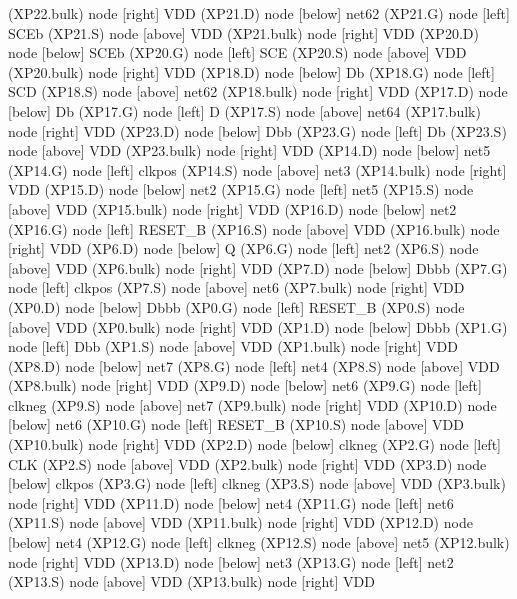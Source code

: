 \begin{circuitikz}[american]
	(XP22.bulk) node [right]	{VDD}
	(XP21.D) node [below]	{net62}
	(XP21.G) node [left]	{SCEb}
	(XP21.S) node [above]	{VDD}
	(XP21.bulk) node [right]	{VDD}
	(XP20.D) node [below]	{SCEb}
	(XP20.G) node [left]	{SCE}
	(XP20.S) node [above]	{VDD}
	(XP20.bulk) node [right]	{VDD}
	(XP18.D) node [below]	{Db}
	(XP18.G) node [left]	{SCD}
	(XP18.S) node [above]	{net62}
	(XP18.bulk) node [right]	{VDD}
	(XP17.D) node [below]	{Db}
	(XP17.G) node [left]	{D}
	(XP17.S) node [above]	{net64}
	(XP17.bulk) node [right]	{VDD}
	(XP23.D) node [below]	{Dbb}
	(XP23.G) node [left]	{Db}
	(XP23.S) node [above]	{VDD}
	(XP23.bulk) node [right]	{VDD}
	(XP14.D) node [below]	{net5}
	(XP14.G) node [left]	{clkpos}
	(XP14.S) node [above]	{net3}
	(XP14.bulk) node [right]	{VDD}
	(XP15.D) node [below]	{net2}
	(XP15.G) node [left]	{net5}
	(XP15.S) node [above]	{VDD}
	(XP15.bulk) node [right]	{VDD}
	(XP16.D) node [below]	{net2}
	(XP16.G) node [left]	{RESET_B}
	(XP16.S) node [above]	{VDD}
	(XP16.bulk) node [right]	{VDD}
	(XP6.D) node [below]	{Q}
	(XP6.G) node [left]	{net2}
	(XP6.S) node [above]	{VDD}
	(XP6.bulk) node [right]	{VDD}
	(XP7.D) node [below]	{Dbbb}
	(XP7.G) node [left]	{clkpos}
	(XP7.S) node [above]	{net6}
	(XP7.bulk) node [right]	{VDD}
	(XP0.D) node [below]	{Dbbb}
	(XP0.G) node [left]	{RESET_B}
	(XP0.S) node [above]	{VDD}
	(XP0.bulk) node [right]	{VDD}
	(XP1.D) node [below]	{Dbbb}
	(XP1.G) node [left]	{Dbb}
	(XP1.S) node [above]	{VDD}
	(XP1.bulk) node [right]	{VDD}
	(XP8.D) node [below]	{net7}
	(XP8.G) node [left]	{net4}
	(XP8.S) node [above]	{VDD}
	(XP8.bulk) node [right]	{VDD}
	(XP9.D) node [below]	{net6}
	(XP9.G) node [left]	{clkneg}
	(XP9.S) node [above]	{net7}
	(XP9.bulk) node [right]	{VDD}
	(XP10.D) node [below]	{net6}
	(XP10.G) node [left]	{RESET_B}
	(XP10.S) node [above]	{VDD}
	(XP10.bulk) node [right]	{VDD}
	(XP2.D) node [below]	{clkneg}
	(XP2.G) node [left]	{CLK}
	(XP2.S) node [above]	{VDD}
	(XP2.bulk) node [right]	{VDD}
	(XP3.D) node [below]	{clkpos}
	(XP3.G) node [left]	{clkneg}
	(XP3.S) node [above]	{VDD}
	(XP3.bulk) node [right]	{VDD}
	(XP11.D) node [below]	{net4}
	(XP11.G) node [left]	{net6}
	(XP11.S) node [above]	{VDD}
	(XP11.bulk) node [right]	{VDD}
	(XP12.D) node [below]	{net4}
	(XP12.G) node [left]	{clkneg}
	(XP12.S) node [above]	{net5}
	(XP12.bulk) node [right]	{VDD}
	(XP13.D) node [below]	{net3}
	(XP13.G) node [left]	{net2}
	(XP13.S) node [above]	{VDD}
	(XP13.bulk) node [right]	{VDD}
\fi




\end{circuitikz}
